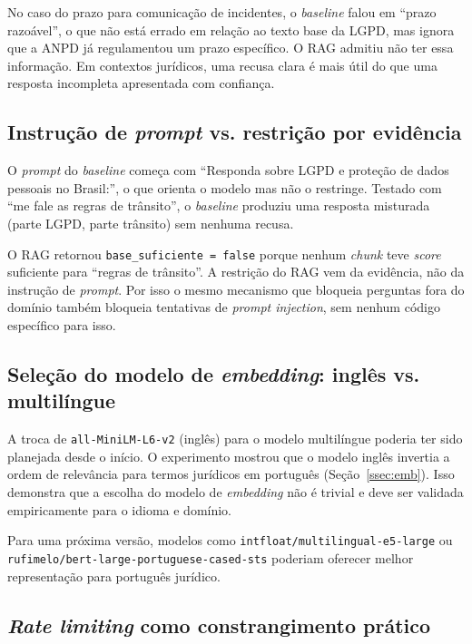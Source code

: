 \documentclass[
  12pt,
  a4paper,
  brazil,
  article,
  oneside,
  sumario=tradicional
]{abntex2}
\begin{document}
No caso do prazo para comunicação de incidentes, o \textit{baseline} falou em ``prazo
razoável'', o que não está errado em relação ao texto base da LGPD, mas ignora que a
ANPD já regulamentou um prazo específico. O RAG admitiu não ter essa informação. Em
contextos jurídicos, uma recusa clara é mais útil do que uma resposta incompleta
apresentada com confiança.

\subsection{Instrução de \textit{prompt} vs. restrição por evidência}

O \textit{prompt} do \textit{baseline} começa com ``Responda sobre LGPD e proteção de
dados pessoais no Brasil:'', o que orienta o modelo mas não o restringe. Testado com
``me fale as regras de trânsito'', o \textit{baseline} produziu uma resposta misturada
(parte LGPD, parte trânsito) sem nenhuma recusa.

O RAG retornou \texttt{base\_suficiente = false} porque nenhum \textit{chunk} teve
\textit{score} suficiente para ``regras de trânsito''. A restrição do RAG vem da
evidência, não da instrução de \textit{prompt}. Por isso o mesmo mecanismo que
bloqueia perguntas fora do domínio também bloqueia tentativas de \textit{prompt
injection}, sem nenhum código específico para isso.

\subsection{Seleção do modelo de \textit{embedding}: inglês vs. multilíngue}

A troca de \texttt{all-MiniLM-L6-v2} (inglês) para o modelo multilíngue poderia ter
sido planejada desde o início. O experimento mostrou que o modelo inglês invertia a
ordem de relevância para termos jurídicos em português (Seção~\ref{ssec:emb}). Isso
demonstra que a escolha do modelo de \textit{embedding} não é trivial e deve ser
validada empiricamente para o idioma e domínio.

Para uma próxima versão, modelos como \texttt{intfloat/multilingual-e5-large} ou
\texttt{rufimelo/bert-large-portuguese-cased-sts} poderiam oferecer melhor
representação para português jurídico.

\subsection{\textit{Rate limiting} como constrangimento prático}
\end{document}
